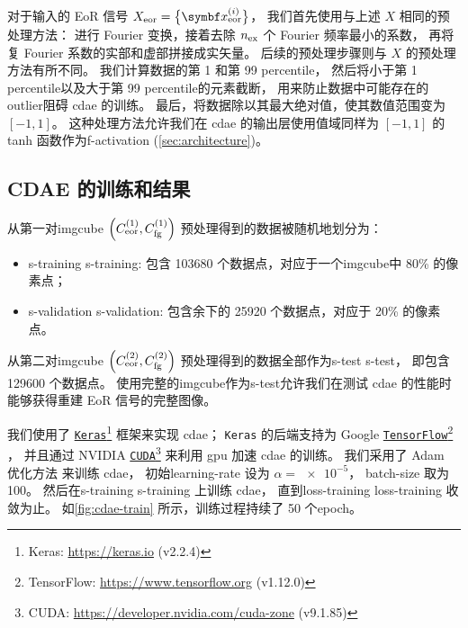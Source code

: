 对于输入的 EoR 信号 $X_{\R{eor}} = \big\{ \B{x}^{(i)}_{\R{eor}} \big\}$，
我们首先使用与上述 $X$ 相同的预处理方法：
进行 Fourier 变换，接着去除 $n_{\mathrm{ex}}$ 个 Fourier 频率最小的系数，
再将复 Fourier 系数的实部和虚部拼接成实矢量。
后续的预处理步骤则与 $X$ 的预处理方法有所不同。
我们计算数据的第 1 和第 99 \ac{percentile}，
然后将小于第 1 \ac{percentile}以及大于第 99 \ac{percentile}的元素截断，
用来防止数据中可能存在的\ac{outlier}阻碍 \ac{cdae} 的训练。
最后，将数据除以其最大绝对值，使其数值范围变为 $[-1, 1]$。
这种处理方法允许我们在 \ac{cdae} 的输出层使用值域同样为 $[-1, 1]$
的 tanh 函数作为\ac{f-activation} (\autoref{sec:architecture})。

\subsection{CDAE 的训练和结果}
\label{sec:cdae-results}

从第一对\ac{imgcube}
$\left( C_{\mathrm{eor}}^{(1)}, C_{\mathrm{fg}}^{(1)} \right)$
预处理得到的数据被随机地划分为：
\begin{itemize}
  \item \acl{s-training} \ac{s-training}:
    包含 \num{103680} 个数据点，对应于一个\ac{imgcube}中 80\% 的像素点；
  \item \acl{s-validation} \ac{s-validation}:
    包含余下的 \num{25920} 个数据点，对应于 20\% 的像素点。
\end{itemize}
从第二对\ac{imgcube}
$\left( C_{\mathrm{eor}}^{(2)}, C_{\mathrm{fg}}^{(2)} \right)$
预处理得到的数据全部作为\acl{s-test} \ac{s-test}，
即包含 \num{129600} 个数据点。
使用完整的\ac{imgcube}作为\acl{s-test}允许我们在测试 \ac{cdae}
的性能时能够获得重建 EoR 信号的完整图像。

我们使用了 \href{https://keras.io}{\texttt{Keras}}\footnote{%
  Keras: \url{https://keras.io} (v2.2.4)}
框架\cite{keras}来实现 \ac{cdae}；
\texttt{Keras} 的后端支持为 Google
\href{https://www.tensorflow.org}{\texttt{TensorFlow}}\footnote{%
  TensorFlow: \url{https://www.tensorflow.org} (v1.12.0)}
\cite{tensorflow}，
并且通过 NVIDIA
\href{https://developer.nvidia.com/cuda-zone}{\texttt{CUDA}}\footnote{%
  CUDA: \url{https://developer.nvidia.com/cuda-zone} (v9.1.85)}
来利用 \ac{gpu} 加速 \ac{cdae} 的训练。
我们采用了 Adam 优化方法\cite{kingma2015} 来训练 \ac{cdae}，
初始\ac{learning-rate} 设为 $\alpha = \num{e-5}$，
\ac{batch-size} 取为 100。
然后在\acl{s-training} \ac{s-training} 上训练 \ac{cdae}，
直到\acl{loss-training} \ac{loss-training} 收敛为止。
如\autoref{fig:cdae-train} 所示，训练过程持续了 50 个\ac{epoch}。

